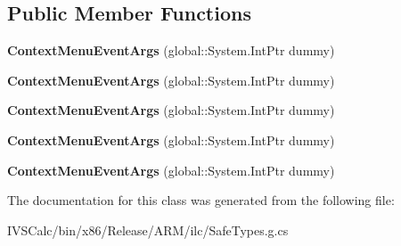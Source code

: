 \subsection*{Public Member Functions}
\begin{DoxyCompactItemize}
\item 
\mbox{\label{class_windows_1_1_u_i_1_1_xaml_1_1_controls_1_1_context_menu_event_args_a28f9b594f5366f9ce75c67b308c72aca}} 
{\bfseries Context\+Menu\+Event\+Args} (global\+::\+System.\+Int\+Ptr dummy)
\item 
\mbox{\label{class_windows_1_1_u_i_1_1_xaml_1_1_controls_1_1_context_menu_event_args_a28f9b594f5366f9ce75c67b308c72aca}} 
{\bfseries Context\+Menu\+Event\+Args} (global\+::\+System.\+Int\+Ptr dummy)
\item 
\mbox{\label{class_windows_1_1_u_i_1_1_xaml_1_1_controls_1_1_context_menu_event_args_a28f9b594f5366f9ce75c67b308c72aca}} 
{\bfseries Context\+Menu\+Event\+Args} (global\+::\+System.\+Int\+Ptr dummy)
\item 
\mbox{\label{class_windows_1_1_u_i_1_1_xaml_1_1_controls_1_1_context_menu_event_args_a28f9b594f5366f9ce75c67b308c72aca}} 
{\bfseries Context\+Menu\+Event\+Args} (global\+::\+System.\+Int\+Ptr dummy)
\item 
\mbox{\label{class_windows_1_1_u_i_1_1_xaml_1_1_controls_1_1_context_menu_event_args_a28f9b594f5366f9ce75c67b308c72aca}} 
{\bfseries Context\+Menu\+Event\+Args} (global\+::\+System.\+Int\+Ptr dummy)
\end{DoxyCompactItemize}


The documentation for this class was generated from the following file\+:\begin{DoxyCompactItemize}
\item 
I\+V\+S\+Calc/bin/x86/\+Release/\+A\+R\+M/ilc/Safe\+Types.\+g.\+cs\end{DoxyCompactItemize}
